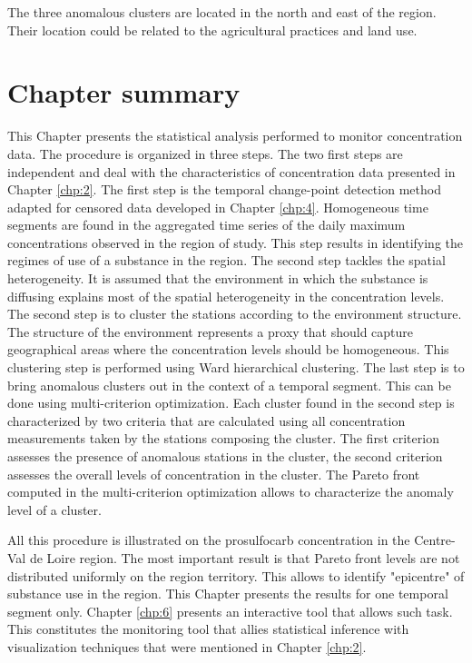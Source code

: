 The three anomalous clusters are located in the north and east of the region. Their location could be related to the agricultural practices and land use. 
\clearpage

\section{Chapter summary}

This Chapter presents the statistical analysis performed to monitor concentration data. The procedure is organized in three steps. The two first steps are independent and deal with the characteristics of concentration data presented in Chapter \ref{chp:2}. The first step is the temporal change-point detection method adapted for censored data developed in Chapter \ref{chp:4}. Homogeneous time segments are found in the aggregated time series of the daily maximum concentrations observed in the region of study. This step results in identifying the regimes of use of a substance in the region. The second step tackles the spatial heterogeneity. It is assumed that the environment in which the substance is diffusing explains most of the spatial heterogeneity in the concentration levels. The second step is to cluster the stations according to the environment structure. The structure of the environment represents a proxy that should capture geographical areas where the concentration levels should be homogeneous. This clustering step is performed using Ward hierarchical clustering. The last step is to bring anomalous clusters out in the context of a temporal segment. This can be done using multi-criterion optimization. Each cluster found in the second step is characterized by two criteria that are calculated using all concentration measurements taken by the stations composing the cluster. The first criterion assesses the presence of anomalous stations in the cluster, the second criterion assesses the overall levels of concentration in the cluster. The Pareto front computed in the multi-criterion optimization allows to characterize the anomaly level of a cluster.  

All this procedure is illustrated on the prosulfocarb concentration in the Centre-Val de Loire region. The most important result is that Pareto front levels are not distributed uniformly on the region territory. This allows to identify "epicentre" of substance use in the region. This Chapter presents the results for one temporal segment only. Chapter \ref{chp:6} presents an interactive tool that allows such task. This constitutes the monitoring tool that allies statistical inference with visualization techniques that were mentioned in Chapter \ref{chp:2}. 
 